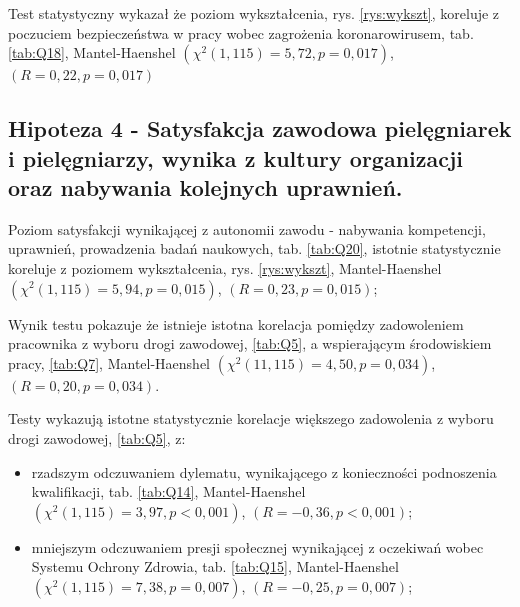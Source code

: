 \documentclass[a4paper,12pt,twoside,openright]{mwrep}
\begin{document}
	Test statystyczny wykazał że poziom wykształcenia, rys. \ref{rys:wykszt}, koreluje z poczuciem bezpieczeństwa w pracy wobec zagrożenia koronarowirusem, tab. \ref{tab:Q18}, Mantel-Haenshel $(\chi^2 (1, 115) = 5,72, p=0,017)$, $(R = 0,22, p = 0,017)$
	

\vspace{\baselineskip} 

\subsection*{Hipoteza 4 - Satysfakcja zawodowa pielęgniarek i pielęgniarzy, wynika z kultury organizacji oraz nabywania kolejnych uprawnień.}




  
  Poziom satysfakcji wynikającej z autonomii zawodu  - nabywania kompetencji, uprawnień, prowadzenia badań naukowych, tab. \ref{tab:Q20}, istotnie statystycznie koreluje z poziomem wykształcenia, rys. \ref{rys:wykszt}, Mantel-Haenshel $(\chi^2 (1, 115) = 5,94, p = 0,015)$, $(R = 0,23, p = 0,015)$; 
  
Wynik testu pokazuje że istnieje istotna korelacja pomiędzy zadowoleniem pracownika z wyboru drogi zawodowej, \ref{tab:Q5}, a wspierającym środowiskiem pracy, \ref{tab:Q7}, Mantel-Haenshel $(\chi^2 (11, 115) = 4,50, p=0,034)$, $(R = 0,20, p = 0,034)$.

Testy wykazują istotne statystycznie korelacje większego zadowolenia z wyboru drogi zawodowej, \ref{tab:Q5}, z:
	\begin{itemize}
		\item rzadszym odczuwaniem dylematu, wynikającego z konieczności podnoszenia kwalifikacji, tab. \ref{tab:Q14}, Mantel-Haenshel $(\chi^2 (1, 115) = 3,97, p < 0,001)$, $(R = -0,36, p < 0,001)$;
		\item mniejszym odczuwaniem presji społecznej wynikającej z oczekiwań wobec Systemu Ochrony Zdrowia, tab. \ref{tab:Q15}, Mantel-Haenshel $(\chi^2 (1, 115) = 7,38, p = 0,007)$, $(R = -0,25, p = 0,007)$;
	\end{itemize}
\end{document}
